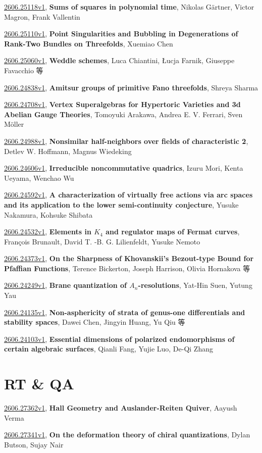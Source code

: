 \documentclass[9pt, a4paper]{article}
\theoremstyle{plain}
\theoremstyle{definition}
\theoremstyle{remark}
\newcommand{\arxiv}[3]{\href{https://arxiv.org/abs/#1}{#1}, \textbf{\textcolor{arxivblue}{#2}}, #3}
\begin{document}
\arxiv{2606.25118v1}{Sums of squares in polynomial time}{Nikolas Gärtner, Victor Magron, Frank Vallentin}

\arxiv{2606.25110v1}{Point Singularities and Bubbling in Degenerations of Rank-Two Bundles on Threefolds}{Xuemiao Chen}

\arxiv{2606.25060v1}{Weddle schemes}{Luca Chiantini, Łucja Farnik, Giuseppe Favacchio 等}

\arxiv{2606.24838v1}{Amitsur groups of primitive Fano threefolds}{Shreya Sharma}

\arxiv{2606.24708v1}{Vertex Superalgebras for Hypertoric Varieties and 3d Abelian Gauge Theories}{Tomoyuki Arakawa, Andrea E. V. Ferrari, Sven Möller}

\arxiv{2606.24988v1}{Nonsimilar half-neighbors over fields of characteristic 2}{Detlev W. Hoffmann, Magnus Wiedeking}

\arxiv{2606.24606v1}{Irreducible noncommutative quadrics}{Izuru Mori, Kenta Ueyama, Wenchao Wu}

\arxiv{2606.24592v1}{A characterization of virtually free actions via arc spaces and its application to the lower semi-continuity conjecture}{Yusuke Nakamura, Kohsuke Shibata}

\arxiv{2606.24532v1}{Elements in $K_4$ and regulator maps of Fermat curves}{François Brunault, David T. -B. G. Lilienfeldt, Yusuke Nemoto}

\arxiv{2606.24373v1}{On the Sharpness of Khovanskii's Bezout-type Bound for Pfaffian Functions}{Terence Bickerton, Joseph Harrison, Olivia Hornakova 等}

\arxiv{2606.24249v1}{Brane quantization of $A_n$-resolutions}{Yat-Hin Suen, Yutung Yau}

\arxiv{2606.24135v1}{Non-asphericity of strata of genus-one differentials and stability spaces}{Dawei Chen, Jingyin Huang, Yu Qiu 等}

\arxiv{2606.24103v1}{Essential dimensions of polarized endomorphisms of certain algebraic surfaces}{Qianli Fang, Yujie Luo, De-Qi Zhang}


\section{RT \& QA}
\arxiv{2606.27362v1}{Hall Geometry and Auslander-Reiten Quiver}{Aayush Verma}

\arxiv{2606.27341v1}{On the deformation theory of chiral quantizations}{Dylan Butson, Sujay Nair}
\end{document}
